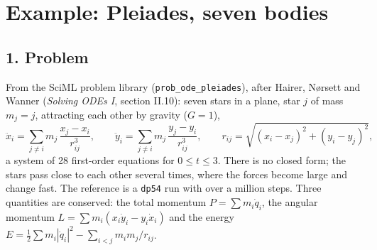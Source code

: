 \documentclass[11pt,a4paper]{article}
\begin{document}
\section*{Example: Pleiades, seven bodies}

\subsection*{1. Problem}
From the SciML problem library (\texttt{prob\_ode\_pleiades}), after Hairer,
N{\o}rsett and Wanner (\emph{Solving ODEs I}, section II.10): seven stars in
a plane, star $j$ of mass $m_j = j$, attracting each other by gravity
($G = 1$),
\begin{equation*}
  \ddot x_i = \sum_{j \ne i} m_j\,\frac{x_j - x_i}{r_{ij}^3}, \qquad
  \ddot y_i = \sum_{j \ne i} m_j\,\frac{y_j - y_i}{r_{ij}^3}, \qquad
  r_{ij} = \sqrt{(x_i - x_j)^2 + (y_i - y_j)^2},
\end{equation*}
a system of 28 first-order equations for $0 \le t \le 3$. There is no closed
form; the stars pass close to each other several times, where the forces
become large and change fast. The reference is a \texttt{dp54} run with
over a million steps. Three quantities are conserved: the total momentum
$P = \sum m_i \dot q_i$, the angular momentum
$L = \sum m_i (x_i\dot y_i - y_i\dot x_i)$ and the energy
$E = \tfrac12\sum m_i|\dot q_i|^2 - \sum_{i<j} m_i m_j / r_{ij}$.
\begin{center}
\small

\end{center}

\newpage
\end{document}
